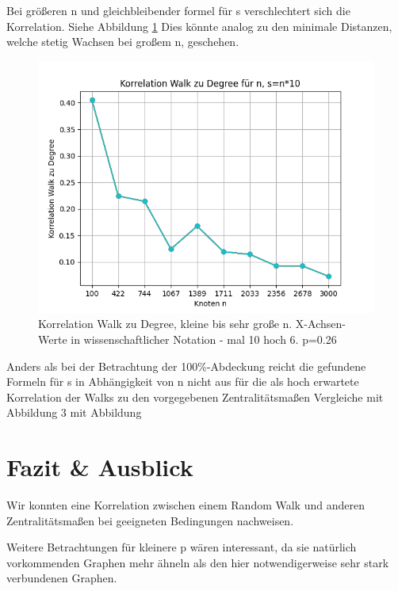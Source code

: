 Bei größeren n und gleichbleibender formel für s verschlechtert sich die Korrelation. Siehe Abbildung \ref{fig:corr_deg_sfix}
Dies könnte analog zu den minimale Distanzen, welche stetig Wachsen bei großem n, geschehen. 
\begin{figure}
    \centering
    \includegraphics[width=\textwidth]{template/chapters/KorrelationWalkDegree_fixedp_sn10_v2}
    \caption{Korrelation Walk zu Degree, kleine bis sehr große n. X-Achsen-Werte in wissenschaftlicher Notation - mal 10 hoch 6. p=0.26}
    \label{fig:corr_deg_sfix}
\end{figure}


Anders als bei der Betrachtung der 100\%-Abdeckung reicht die gefundene Formeln für s in Abhängigkeit von n nicht aus für die als hoch erwartete Korrelation der Walks zu den vorgegebenen Zentralitätsmaßen
Vergleiche mit Abbildung 3  mit Abbildung %


\section{Fazit \& Ausblick}

Wir konnten eine Korrelation zwischen einem Random Walk und anderen Zentralitätsmaßen bei geeigneten Bedingungen nachweisen. 

Weitere Betrachtungen für kleinere p wären interessant, da sie natürlich vorkommenden Graphen mehr ähneln als den hier notwendigerweise sehr stark verbundenen Graphen.



